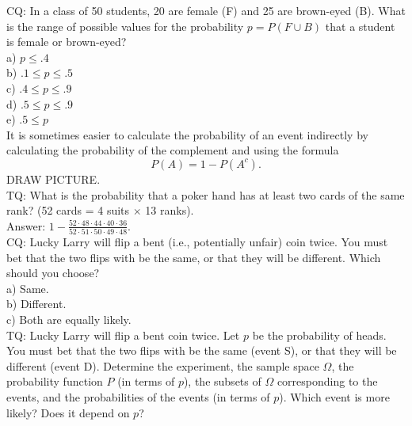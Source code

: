CQ: In a class of 50 students, 20 are female (F) and 25 are brown-eyed (B).  What is the range of possible values for the probability $p = P(F \cup B)$ that a student is female or brown-eyed? \\
a) $p \leq .4$ \\
b) $.1 \leq p \leq .5$ \\
c) $.4 \leq p \leq .9$ \\
d) $.5 \leq p \leq .9$ \\
e) $.5 \leq p$ \\

It is sometimes easier to calculate the probability of an event indirectly by calculating the probability of the complement and using the formula
$$P(A) = 1 - P(A^c).$$
DRAW PICTURE. \\

TQ: What is the probability that a poker hand has at least two cards of the same rank?  (52 cards = 4 suits $\times$ 13 ranks).\\

Answer: $1 - \frac{52\cdot48\cdot44\cdot40\cdot36}{52\cdot51\cdot50\cdot49\cdot48}.$\\

CQ: Lucky Larry will flip a bent (i.e., potentially unfair) coin twice.  You must bet that the two flips with be the same, or that they will be different.  Which should you choose? \\
a) Same.  \\
b) Different. \\
c) Both are equally likely. \\

TQ:  Lucky Larry will flip a bent coin twice.  Let $p$ be the probability of heads.  You must bet that the two flips with be the same (event S), or that they will be different (event D).  Determine the experiment, the sample space $\Omega$, the probability function $P$ (in terms of $p$), the subsets of $\Omega$ corresponding to the events, and the probabilities of the events (in terms of $p$).  Which event is more likely?  Does it depend on $p$?



